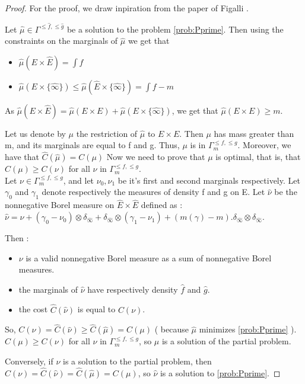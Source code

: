 \documentclass[a4paper,11pt]{article}
\theoremstyle{definition}
\begin{document}
\begin{proof}
For the proof, we draw inpiration from the paper of Figalli \cite{fig}.

Let $\hat \mu \in \Gamma^{\leq \hat f,\leq \hat g}$ be a solution to the problem \ref{prob:Pprime}.
Then using the constraints on the marginals of $\hat \mu$ we get that \begin{itemize}
    \item $\hat \mu(E \times \hat E) = \int f$
    \item $\hat \mu(E \times \{\hat \infty\}) \leq \hat \mu(\hat E \times \{\hat \infty\}) = \int f - m$
\end{itemize} 

As $\hat \mu(E \times \hat E) = \hat \mu(E \times E)+\hat \mu(E \times \{\hat \infty\})$, we get that $\hat \mu(E\times E) \geq m$.

Let us denote by $\mu$ the restriction of $\hat \mu$ to $E\times E$. Then $\mu$ has mass greater than m, and its marginals are equal to f and g. Thus, $\mu$ is in $\Gamma_m^{\leq f, \leq g}$. Moreover, we have that $\hat C (\hat \mu) = C(\mu)$
Now we need to prove that $\mu$ is optimal, that is, that $C(\mu) \geq C(\nu) $ for all $\nu$ in $\Gamma^{\leq f, \leq g} _m$.\\

Let $\nu \in \Gamma^{\leq f, \leq g}_m$, and let $\nu_0, \nu_1$ be it's first and second marginals respectively. Let $\gamma_0$ and $\gamma_1$ denote respectively the measures of density f and g on E. Let $\hat \nu$ be the nonnegative Borel measure on $\hat E \times \hat E$ defined as : $\hat \nu = \nu + (\gamma_0-\nu_0)\otimes \delta_{\hat \infty}+ \delta_{\hat \infty}\otimes (\gamma_1-\nu_1) + (m(\gamma) - m). \delta_{\hat \infty} \otimes \delta_{\hat \infty}$.

Then : \begin{itemize}
    \item $\nu$ is a valid nonnegative Borel measure as a sum of nonnegative Borel measures.
    \item the marginals of $\hat \nu$ have respectively density $\hat f$ and $\hat g$.
    \item the cost $ \hat C(\hat \nu)$ is equal to $C(\nu)$.
\end{itemize}

So, $C(\nu) = \hat C(\hat \nu) \geq  \hat C(\hat \mu) = C(\mu)$ ( because $\hat \mu$ minimizes \ref{prob:Pprime} ). $C(\mu) \geq C(\nu) $ for all $\nu$ in $\Gamma^{\leq f, \leq g} _m$, so $\mu$ is a solution of the partial problem.

Conversely, if $\nu$ is a solution to the partial problem, then  $C(\nu) = \hat C(\hat \nu) =  \hat C(\hat \mu) = C(\mu)$, so $\hat \nu$ is a solution to \ref{prob:Pprime}. 

\end{proof}
\end{document}
